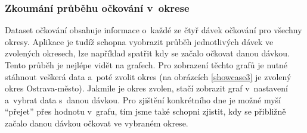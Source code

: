\clearpage

\subsubsection*{Zkoumání průběhu očkování v~okrese}

Dataset očkování obsahuje informace o~každé ze čtyř dávek očkování pro všechny okresy. Aplikace je tudíž schopna vyobrazit průběh jednotlivých dávek ve zvolených okresech, lze například spatřit kdy se začalo očkovat danou dávkou. Tento průběh je nejlépe vidět na grafech. Pro zobrazení těchto grafů je nutné stáhnout veškerá data a~poté zvolit okres (na obrázcích \ref{showcase3} je zvolený okres Ostrava-město). Jakmile je okres zvolen, stačí zobrazit graf v~nastavení a~vybrat data s~danou dávkou. Pro zjištění konkrétního dne je možné myší \enquote{přejet} přes hodnotu v~grafu, tím jsme také schopni zjistit, kdy se přibližně začalo danou dávkou očkovat ve vybraném okrese.
\vspace*{0.5in}
